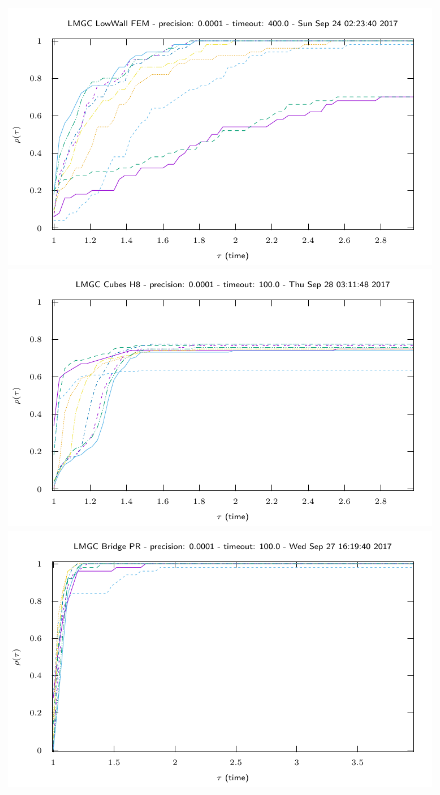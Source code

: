 \begin{figure}
  \centering\vspace{-0.5cm}
  \includegraphics[width=\figwidth]{../figure/NSGS/LocalTol/1.0e-04/400/time/profile-LMGC_LowWall_FEM.pdf} 
\includegraphics[width=\figwidth]{../figure/NSGS/LocalTol/1.0e-04/100/time/profile-LMGC_Cubes_H8.pdf} 
\includegraphics[width=\figwidth]{../figure/NSGS/LocalTol/1.0e-04/100/time/profile-LMGC_Bridge_PR.pdf} 

\end{figure}
